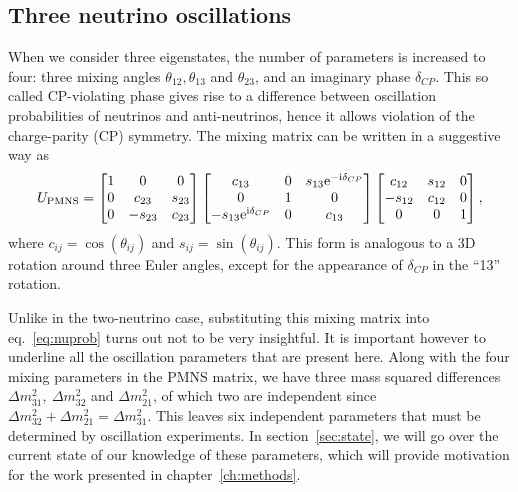 \subsection{Three neutrino oscillations}
When we consider three eigenstates, the number of parameters is increased to
four\cite{langacker}:
three mixing angles $\theta_{12}, \theta_{13}$ and $\theta_{23}$, and an
imaginary phase $\delta_{CP}$. This so called CP-violating phase gives rise to
a difference between oscillation probabilities of neutrinos and anti-neutrinos,
hence it allows violation of the charge-parity (CP) symmetry. 
The mixing matrix can be written in a suggestive way as
\begin{equation}\label{eq:PMNS}
U_{\mathrm{PMNS}} = 
\begin{bmatrix} 1 & 0 & 0 \\ 0 & c_{23} & s_{23} \\ 0 & -s_{23} & c_{23} \end{bmatrix}
\begin{bmatrix} c_{13} & 0 & s_{13} \mathrm{e}^{-\mathrm{i} \delta_{CP}} \\ 0 & 1 & 0 \\
								-s_{13} \mathrm{e}^{\mathrm{i} \delta_{CP}} & 0 & c_{13} \end{bmatrix} 
\begin{bmatrix} c_{12} & s_{12} & 0 \\ -s_{12} & c_{12} & 0 \\ 0 & 0 & 1 \end{bmatrix}
,\end{equation}
where $c_{ij} = \cos(\theta_{ij})$ and $s_{ij} = \sin(\theta_{ij})$.
This form is analogous to a 3D rotation around three Euler angles, except for
the appearance of $\delta_{CP}$ in the ``13'' rotation.

Unlike in the two-neutrino case, substituting this mixing matrix into
eq.~\ref{eq:nuprob} turns out not to be very insightful. It is important
however to underline all the oscillation parameters that are present here.
Along with the four mixing parameters in the PMNS matrix, we have three mass
squared differences $\Delta m^2_{31},~\Delta m^2_{32}$ and $\Delta m^2_{21}$,
of which two are independent since $\Delta m^2_{32} + \Delta m^2_{21} = \Delta
m^2_{31}$. This leaves six independent
parameters that must be determined by oscillation experiments.
In section~\ref{sec:state}, we will go over the current state of our knowledge
of these parameters, which will provide motivation for the work presented in
chapter~\ref{ch:methods}.


